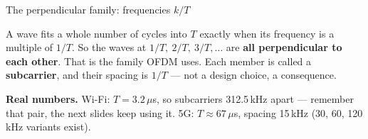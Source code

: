 \begin{frame}{The perpendicular family: frequencies $k/T$}
  \vspace{0.3em}
  \centering

  \vspace{0.6em}
  {\small A wave fits a whole number of cycles into $T$ exactly when its frequency is
   a multiple of $1/T$. So the waves at $1/T,\ 2/T,\ 3/T,\ldots$ are \textbf{all
   perpendicular to each other}. That is the family OFDM uses. Each member is called
   a \textbf{subcarrier}, and their spacing is $1/T$ --- not a design choice, a
   consequence.\par}

  \vspace{0.3em}
  {\small\textbf{Real numbers.} Wi-Fi: $T = 3.2\,\mu$s, so subcarriers 312.5\,kHz
   apart --- remember that pair, the next slides keep using it. 5G: $T\approx
   67\,\mu$s, spacing 15\,kHz (30, 60, 120\,kHz variants exist).\par}

  \vspace{0.3em}
\end{frame}

